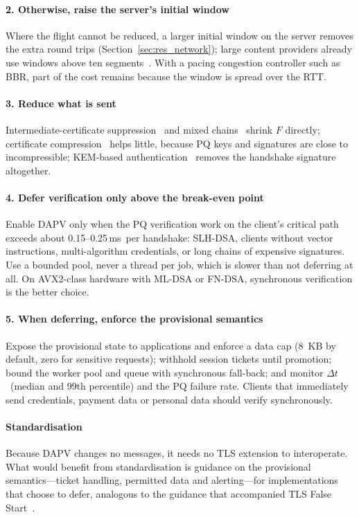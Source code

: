 \documentclass[preprint,10pt,3p]{elsarticle}
\newcommand{\Dt}{\ensuremath{\Delta t}}
\newcommand{\ms}{\,ms}
\begin{document}
\paragraph{2. Otherwise, raise the server's initial window}  Where the
flight cannot be reduced, a larger initial window on the server removes
the extra round trips (Section~\ref{sec:res_network}); large content
providers already use windows above ten segments~\cite{Dukkipati2010IW}.
With a pacing congestion controller such as BBR, part of the cost remains
because the window is spread over the RTT.

\paragraph{3. Reduce what is sent}  Intermediate-certificate
suppression~\cite{KampanakisKallitsis2022,Sikeridis2022ICA} and mixed
chains~\cite{Paul2022} shrink $F$ directly; certificate
compression~\cite{RFC8879} helps little, because PQ keys and signatures are
close to incompressible; KEM-based authentication~\cite{Schwabe2020KEMTLS}
removes the handshake signature altogether.

\paragraph{4. Defer verification only above the break-even point}  Enable
DAPV only when the PQ verification work on the client's critical path
exceeds about 0.15--0.25\ms\ per handshake: SLH-DSA, clients without vector
instructions, multi-algorithm credentials, or long chains of expensive
signatures.  Use a bounded pool, never a thread per job, which is slower
than not deferring at all.  On AVX2-class hardware with ML-DSA or FN-DSA,
synchronous verification is the better choice.

\paragraph{5. When deferring, enforce the provisional semantics}  Expose the
provisional state to applications and enforce a data cap (8~KB by default,
zero for sensitive requests); withhold session tickets until promotion;
bound the worker pool and queue with synchronous fall-back; and monitor
\Dt\ (median and 99th percentile) and the PQ failure rate.  Clients that
immediately send credentials, payment data or personal data should verify
synchronously.

\paragraph{Standardisation}  Because DAPV changes no messages, it needs no
TLS extension to interoperate.  What would benefit from standardisation is
guidance on the provisional semantics---ticket handling, permitted data and
alerting---for implementations that choose to defer, analogous to the
guidance that accompanied TLS False Start~\cite{RFC7918}.
\end{document}
